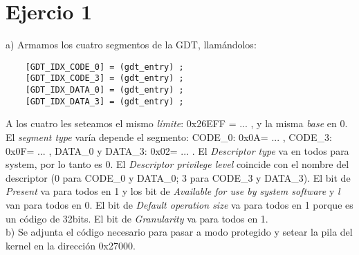 \documentclass[a4paper]{article}
\begin{document}
\thispagestyle{empty}

 


\maketitle
\newpage


\newpage


\newpage
\section{Ejercio 1}
{\large a)} Armamos los cuatro segmentos de la GDT, llam\'andolos: 
\begin{codesnippet}
\begin{verbatim}
    [GDT_IDX_CODE_0] = (gdt_entry) ; 
    [GDT_IDX_CODE_3] = (gdt_entry) ; 
    [GDT_IDX_DATA_0] = (gdt_entry) ;  
    [GDT_IDX_DATA_3] = (gdt_entry) ; 
\end{verbatim}
\end{codesnippet}
    
A los cuatro les seteamos el mismo \emph{l\'imite}: 0x26EFF = ... , y la misma \emph{base} en 0. El \emph{segment type} var\'ia depende el segmento: CODE_0: 0x0A= ... , CODE_3: 0x0F= ... , DATA_0 y DATA_3: 0x02= ... . El \emph{Descriptor type} va en todos para system, por lo tanto es 0. El \emph{Descriptor privilege level} coincide con el nombre del descriptor (0 para CODE_0 y DATA_0; 3 para CODE_3 y DATA_3). El bit de \emph{Present} va para todos en 1 y los bit de \emph{Available for use by system software} y \emph{l} van para todos en 0. El bit de \emph{Default operation size} va para todos en 1 porque es un c\'odigo de 32bits. El bit de \emph{Granularity} va para todos en 1.\\
    


{\large b)} Se adjunta el c\'odigo necesario para pasar a modo protegido y setear la pila del kernel en
la direcci\'on 0x27000.
\end{document}

